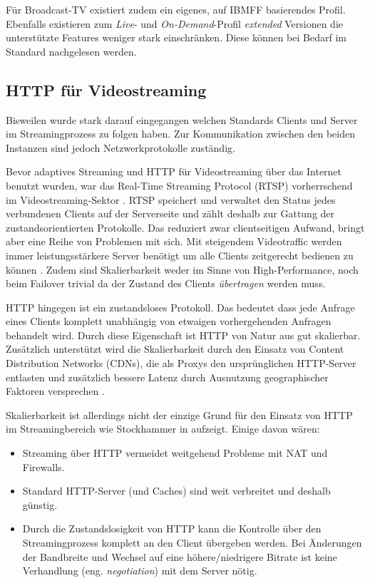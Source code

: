 \documentclass[paper = a4, fontsize = 12pt, parskip = half]{scrartcl} %
\begin{document}
Für Broadcast-TV existiert zudem ein eigenes, auf IBMFF basierendes Profil. Ebenfalls existieren zum \textit{Live}- und \textit{On-Demand}-Profil \textit{extended} Versionen die unterstützte Features weniger stark einschränken. Diese können bei Bedarf im Standard nachgelesen werden.

\subsection{HTTP für Videostreaming}
Bisweilen wurde stark darauf eingegangen welchen Standards Clients und Server im Streamingprozess zu folgen haben. Zur Kommunikation zwischen den beiden Instanzen sind jedoch Netzwerkprotokolle zuständig.

Bevor adaptives Streaming und HTTP für Videostreaming über das Internet benutzt wurden, war das Real-Time Streaming Protocol (RTSP) vorherrschend im Videostreaming-Sektor \cite{stockhammer_dynamic_2011}. RTSP speichert und verwaltet den Status jedes verbundenen Clients auf der Serverseite und zählt deshalb zur Gattung der zustandsorientierten Protokolle. Das reduziert zwar clientseitigen Aufwand, bringt aber eine Reihe von Problemen mit sich. Mit steigendem Videotraffic werden immer leistungsstärkere Server benötigt um alle Clients zeitgerecht bedienen zu können \cite{stockhammer_dynamic_2011}. Zudem sind Skalierbarkeit weder im Sinne von High-Performance, noch beim Failover trivial da der Zustand des Clients \textit{übertragen} werden muss.

HTTP hingegen ist ein zustandsloses Protokoll. Das bedeutet dass jede Anfrage eines Clients komplett unabhängig von etwaigen vorhergehenden Anfragen behandelt wird. Durch diese Eigenschaft ist HTTP von Natur aus gut skalierbar. Zusätzlich unterstützt wird die Skalierbarkeit durch den Einsatz von Content Distribution Networks (CDNs), die als Proxys den ursprünglichen HTTP-Server entlasten und zusätzlich bessere Latenz durch Ausnutzung geographischer Faktoren versprechen \cite{buyya_content_2008}.

Skalierbarkeit ist allerdings nicht der einzige Grund für den Einsatz von HTTP im Streamingbereich wie Stockhammer in \cite{stockhammer_dynamic_2011} aufzeigt. Einige davon wären: 

\begin{itemize}
	\item Streaming über HTTP vermeidet weitgehend Probleme mit NAT und Firewalls.
	\item Standard HTTP-Server (und Caches) sind weit verbreitet und deshalb günstig.
	\item Durch die Zustandslosigkeit von HTTP kann die Kontrolle über den Streamingprozess komplett an den Client übergeben werden. Bei Änderungen der Bandbreite und Wechsel auf eine höhere/niedrigere Bitrate ist keine Verhandlung (eng. \textit{negotiation}) mit dem Server nötig.
\end{itemize}
\end{document}
